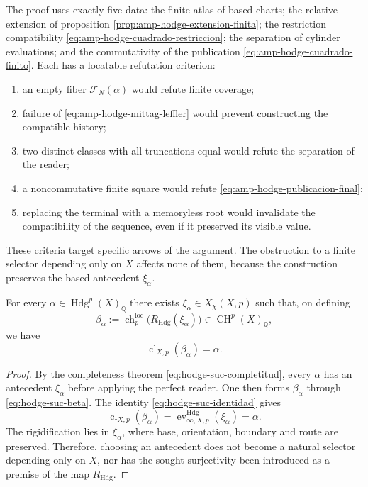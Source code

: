 The proof uses exactly five data: the finite atlas of based
charts; the relative extension of proposition
\ref{prop:amp-hodge-extension-finita}; the restriction compatibility
\eqref{eq:amp-hodge-cuadrado-restriccion}; the separation of cylinder
evaluations; and the commutativity of the publication
\eqref{eq:amp-hodge-cuadrado-finito}. Each has a locatable refutation
criterion:
\begin{enumerate}
 \item an empty fiber \(\mathscr F_N(\alpha)\) would refute finite coverage;
 \item failure of \eqref{eq:amp-hodge-mittag-leffler} would prevent constructing the
       compatible history;
 \item two distinct classes with all truncations equal would refute the
       separation of the reader;
 \item a noncommutative finite square would refute
       \eqref{eq:amp-hodge-publicacion-final};
 \item replacing the terminal with a memoryless root would invalidate the
       compatibility of the sequence, even if it preserved its visible value.
\end{enumerate}
These criteria target specific arrows of the argument. The obstruction to a
finite selector depending only on \(X\) affects none of them, because
the construction preserves the based antecedent \(\xi_\alpha\).

\begin{theorem}
\label{thm:hodge-suc-generacion}
For every \(\alpha\in\operatorname{Hdg}^{p}(X)_{\mathbb Q}\) there exists
\(\xi_{\alpha}\in X_{\chi}(X,p)\) such that, on defining
\begin{equation}\label{eq:hodge-suc-beta}
 \beta_{\alpha}:=
 \operatorname{ch}^{\mathrm{loc}}_{p}
 \bigl(R_{\mathrm{Hdg}}(\xi_{\alpha})\bigr)
 \in\operatorname{CH}^{p}(X)_{\mathbb Q},
\end{equation}
we have
\begin{equation}\label{eq:hodge-suc-cl-beta}
 \operatorname{cl}_{X,p}(\beta_{\alpha})=\alpha.
\end{equation}
\end{theorem}

\begin{proof}
By the completeness theorem
\eqref{eq:hodge-suc-completitud}, every \(\alpha\) has an antecedent
\(\xi_{\alpha}\) before applying the perfect reader. One then forms
\(\beta_{\alpha}\) through \eqref{eq:hodge-suc-beta}. The identity
\eqref{eq:hodge-suc-identidad} gives
\[
 \operatorname{cl}_{X,p}(\beta_{\alpha})
 =\operatorname{ev}^{\mathrm{Hdg}}_{\infty,X,p}(\xi_{\alpha})
 =\alpha.
\]
The rigidification lies in \(\xi_{\alpha}\), where base,
orientation, boundary and route are preserved. Therefore, choosing an antecedent does not
become a natural selector depending only on \(X\), nor has the
sought surjectivity been introduced as a premise of the map
\(R_{\mathrm{Hdg}}\).
\end{proof}

